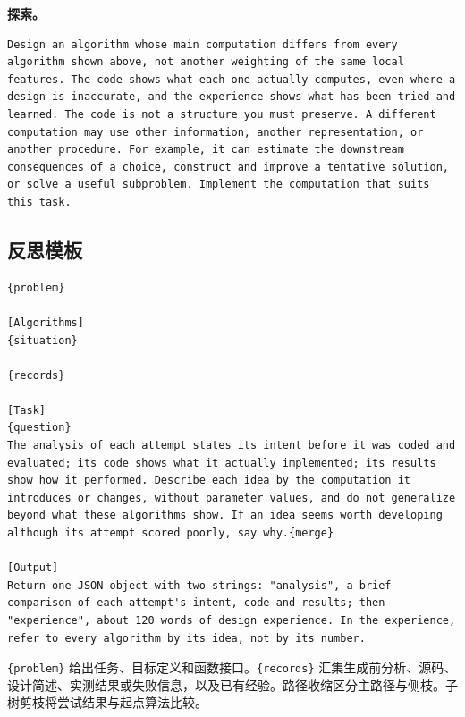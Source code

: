 \documentclass{article}
\begin{document}
\noindent\begin{minipage}{\linewidth}
\textbf{探索。}

\begin{verbatim}
Design an algorithm whose main computation differs from every algorithm shown above, not another weighting of the same local features. The code shows what each one actually computes, even where a design is inaccurate, and the experience shows what has been tried and learned. The code is not a structure you must preserve. A different computation may use other information, another representation, or another procedure. For example, it can estimate the downstream consequences of a choice, construct and improve a tentative solution, or solve a useful subproblem. Implement the computation that suits this task.
\end{verbatim}
\end{minipage}\par

\subsection{反思模板}\label{ux53cdux601dux6a21ux677f}

\noindent\begin{minipage}{\linewidth}
\begin{verbatim}
{problem}

[Algorithms]
{situation}

{records}

[Task]
{question}
The analysis of each attempt states its intent before it was coded and evaluated; its code shows what it actually implemented; its results show how it performed. Describe each idea by the computation it introduces or changes, without parameter values, and do not generalize beyond what these algorithms show. If an idea seems worth developing although its attempt scored poorly, say why.{merge}

[Output]
Return one JSON object with two strings: "analysis", a brief comparison of each attempt's intent, code and results; then "experience", about 120 words of design experience. In the experience, refer to every algorithm by its idea, not by its number.
\end{verbatim}
\end{minipage}\par

\texttt{\{problem\}} 给出任务、目标定义和函数接口。\texttt{\{records\}} 汇集生成前分析、源码、设计简述、实测结果或失败信息，以及已有经验。路径收缩区分主路径与侧枝。子树剪枝将尝试结果与起点算法比较。
\end{document}
